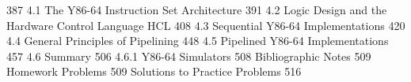 \documentclass[chapter,oneside]{oblivoir}
\begin{document}
387
4.1 The Y86-64 Instruction Set Architecture 391
4.2 Logic Design and the Hardware Control Language HCL 408
4.3 Sequential Y86-64 Implementations 420
4.4 General Principles of Pipelining 448
4.5 Pipelined Y86-64 Implementations 457
4.6 Summary 506
4.6.1 Y86-64 Simulators 508
Bibliographic Notes 509
Homework Problems 509
Solutions to Practice Problems 516


















\end{document}
